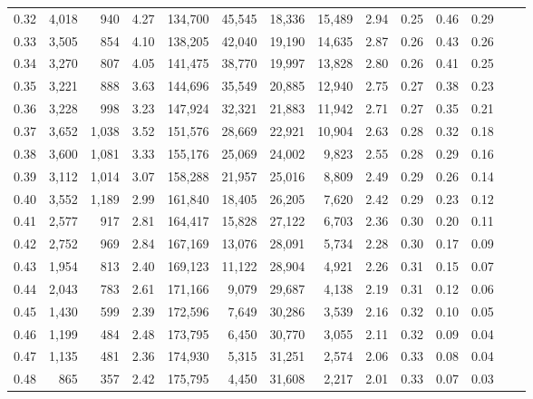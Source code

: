 \begin{tabular}{rrrrrrrrrrrrrr}
0.32 &  4,018 &    940 &    4.27 &  134,700 &   45,545 &  18,336 &  15,489 &  2.94 &  0.25 &  0.46 &      0.29 \\
0.33 &  3,505 &    854 &    4.10 &  138,205 &   42,040 &  19,190 &  14,635 &  2.87 &  0.26 &  0.43 &      0.26 \\
0.34 &  3,270 &    807 &    4.05 &  141,475 &   38,770 &  19,997 &  13,828 &  2.80 &  0.26 &  0.41 &      0.25 \\
0.35 &  3,221 &    888 &    3.63 &  144,696 &   35,549 &  20,885 &  12,940 &  2.75 &  0.27 &  0.38 &      0.23 \\
0.36 &  3,228 &    998 &    3.23 &  147,924 &   32,321 &  21,883 &  11,942 &  2.71 &  0.27 &  0.35 &      0.21 \\
0.37 &  3,652 &  1,038 &    3.52 &  151,576 &   28,669 &  22,921 &  10,904 &  2.63 &  0.28 &  0.32 &      0.18 \\
0.38 &  3,600 &  1,081 &    3.33 &  155,176 &   25,069 &  24,002 &   9,823 &  2.55 &  0.28 &  0.29 &      0.16 \\
0.39 &  3,112 &  1,014 &    3.07 &  158,288 &   21,957 &  25,016 &   8,809 &  2.49 &  0.29 &  0.26 &      0.14 \\
0.40 &  3,552 &  1,189 &    2.99 &  161,840 &   18,405 &  26,205 &   7,620 &  2.42 &  0.29 &  0.23 &      0.12 \\
0.41 &  2,577 &    917 &    2.81 &  164,417 &   15,828 &  27,122 &   6,703 &  2.36 &  0.30 &  0.20 &      0.11 \\
0.42 &  2,752 &    969 &    2.84 &  167,169 &   13,076 &  28,091 &   5,734 &  2.28 &  0.30 &  0.17 &      0.09 \\
0.43 &  1,954 &    813 &    2.40 &  169,123 &   11,122 &  28,904 &   4,921 &  2.26 &  0.31 &  0.15 &      0.07 \\
0.44 &  2,043 &    783 &    2.61 &  171,166 &    9,079 &  29,687 &   4,138 &  2.19 &  0.31 &  0.12 &      0.06 \\
0.45 &  1,430 &    599 &    2.39 &  172,596 &    7,649 &  30,286 &   3,539 &  2.16 &  0.32 &  0.10 &      0.05 \\
0.46 &  1,199 &    484 &    2.48 &  173,795 &    6,450 &  30,770 &   3,055 &  2.11 &  0.32 &  0.09 &      0.04 \\
0.47 &  1,135 &    481 &    2.36 &  174,930 &    5,315 &  31,251 &   2,574 &  2.06 &  0.33 &  0.08 &      0.04 \\
0.48 &    865 &    357 &    2.42 &  175,795 &    4,450 &  31,608 &   2,217 &  2.01 &  0.33 &  0.07 &      0.03 \\

\end{tabular}
